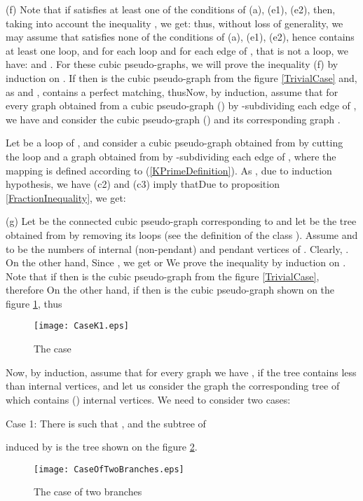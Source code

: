 \documentclass[fleqn,12pt,twoside]{article}
\newenvironment{proof}[1][Proof.]{\begin{trivlist}
\item[\hskip \labelsep {\bfseries #1}]}{\end{trivlist}}
\begin{document}
\begin{proof}
(f) Note that if  satisfies at least one of the conditions of
(a), (e1), (e2), then, taking into account the inequality , we get:
thus, without loss of generality, we may assume that 
satisfies none of the conditions of (a), (e1), (e2), hence 
contains at least one loop, and for each loop  and for each edge
 of , that is not a loop, we have:  and .
For these cubic pseudo-graphs, we will prove the inequality (f) by
induction on . If  then  is the cubic
pseudo-graph from the figure \ref{TrivialCase} and, as  and ,  contains a perfect matching, thusNow, by induction, assume that for every graph 
obtained from a cubic pseudo-graph  ()
by -subdividing each edge 
of , we have
and consider the cubic pseudo-graph  () and its
corresponding graph .

Let  be a loop of , and consider a cubic pseudo-graph  obtained from  by cutting the loop  and a graph  obtained from  by -subdividing each edge  of , where the
mapping  is defined according to
(\ref{KPrimeDefinition}). As , due to induction
hypothesis, we have
(c2) and (c3) imply thatDue to proposition \ref{FractionInequality}, we get:


(g) Let  be the connected cubic pseudo-graph corresponding to
 and let  be the tree obtained from  by
removing its loops (see the definition of the class ).
Assume  and  to be the numbers of internal (non-pendant) and pendant vertices of . Clearly, . On the other
hand,
Since , we get
or
We prove the inequality by induction on . Note that if  then
 is the cubic pseudo-graph from the figure \ref{TrivialCase},
therefore
On the other hand, if  then  is the cubic pseudo-graph
shown on the figure \ref{Case k1}, thus


\begin{figure}[h]
\begin{center}
\texttt{[image: CaseK1.eps]}\\
\caption{The case }\label{Case k1}
\end{center}
\end{figure}

Now, by induction, assume that for every graph  we have , if the tree
 contains less than  internal vertices,
and let us consider the graph  the corresponding
tree  of which contains () internal
vertices. We need to consider two cases:

Case 1: There is  such that ,  and the subtree of

induced by  is the tree shown on the figure \ref{Case of two branches}.

\begin{figure}[h]
\begin{center}
\texttt{[image: CaseOfTwoBranches.eps]}\\
\caption{The case of two branches}\label{Case of two branches}
\end{center}
\end{figure}


\end{proof}
\end{document}
